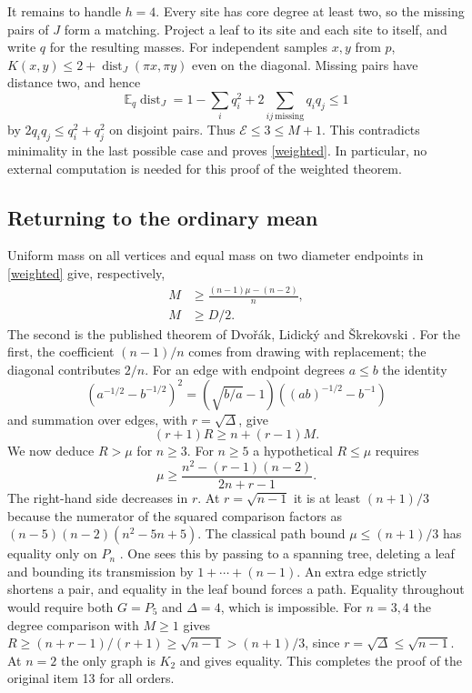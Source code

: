 \documentclass[11pt,a4paper]{article}
\theoremstyle{remark}\newtheorem*{remark}{Remark}
\DeclareMathOperator{\dist}{dist}
\begin{document}
It remains to handle $h=4$. Every site has core degree at least two, so the missing pairs of $J$ form a matching. Project a leaf to its site and each site to itself, and write $q$ for the resulting masses. For independent samples $x,y$ from $p$, $K(x,y)\le2+\dist_J(\pi x,\pi y)$ even on the diagonal. Missing pairs have distance two, and hence
\[
 \mathbb E_q\dist_J
 =1-\sum_i q_i^2+2\sum_{ij\ \mathrm{missing}}q_iq_j\le1
\]
by $2q_iq_j\le q_i^2+q_j^2$ on disjoint pairs. Thus $\mathcal E\le3\le M+1$. This contradicts minimality in the last possible case and proves \eqref{weighted}. In particular, no external computation is needed for this proof of the weighted theorem.



\subsection{Returning to the ordinary mean}
Uniform mass on all vertices and equal mass on two diameter endpoints in \eqref{weighted} give, respectively,
\begin{align}
 M&\ge\frac{(n-1)\mu-(n-2)}n ,\label{uniform}\\
 M&\ge D/2.\label{diameter}
\end{align}
The second is the published theorem of Dvo\v{r}\'ak, Lidick\'y and \v{S}krekovski \cite{dls}. For the first, the coefficient $(n-1)/n$ comes from drawing with replacement; the diagonal contributes $2/n$. For an edge with endpoint degrees $a\le b$ the identity
\[
 (a^{-1/2}-b^{-1/2})^2=(\sqrt{b/a}-1)((ab)^{-1/2}-b^{-1})
\]
and summation over edges, with $r=\sqrt\Delta$, give
\begin{equation}
 (r+1)R\ge n+(r-1)M.\label{randicbridge}
\end{equation}
We now deduce $R>\mu$ for $n\ge3$. For $n\ge5$ a hypothetical $R\le\mu$ requires
\[
 \mu\ge\frac{n^2-(r-1)(n-2)}{2n+r-1}.
\]
The right-hand side decreases in $r$. At $r=\sqrt{n-1}$ it is at least $(n+1)/3$ because the numerator of the squared comparison factors as $(n-5)(n-2)(n^2-5n+5)$. The classical path bound $\mu\le(n+1)/3$ has equality only on $P_n$ \cite{ejs}. One sees this by passing to a spanning tree, deleting a leaf and bounding its transmission by $1+\cdots+(n-1)$. An extra edge strictly shortens a pair, and equality in the leaf bound forces a path. Equality throughout would require both $G=P_5$ and $\Delta=4$, which is impossible. For $n=3,4$ the degree comparison with $M\ge1$ gives $R\ge(n+r-1)/(r+1)\ge\sqrt{n-1}>(n+1)/3$, since $r=\sqrt\Delta\le\sqrt{n-1}$. At $n=2$ the only graph is $K_2$ and gives equality. This completes the proof of the original item 13 for all orders.
\end{document}
